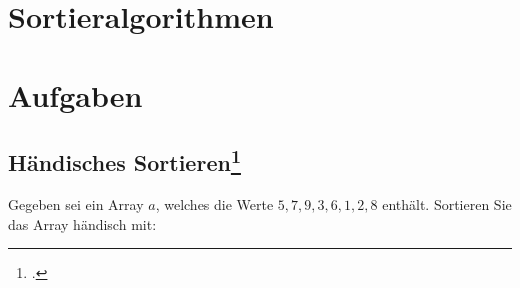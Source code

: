 \documentclass{lehramt-informatik-haupt}
\begin{document}

\chapter{Sortieralgorithmen}

\begin{quellen}
\cite{wiki:sortierverfahren}
\end{quellen}


\chapter{Aufgaben}

\section{Händisches Sortieren\footcite[Seite 1]{aud:pu:1}}

Gegeben sei ein Array $a$, welches die Werte $5,7,9,3,6,1,2,8$ enthält.
Sortieren Sie das Array händisch mit:
\end{document}
